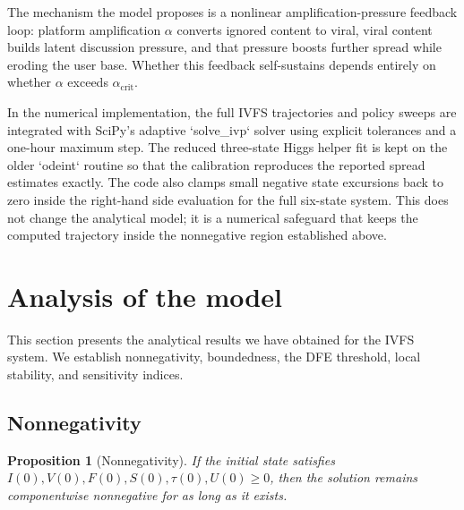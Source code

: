 \documentclass[11pt]{article}
\newtheorem{proposition}{Proposition}
\begin{document}
The mechanism the model proposes is a nonlinear amplification-pressure feedback loop: platform amplification $\alpha$ converts ignored content to viral, viral content builds latent discussion pressure, and that pressure boosts further spread while eroding the user base. Whether this feedback self-sustains depends entirely on whether $\alpha$ exceeds $\alpha_{\mathrm{crit}}$.

In the numerical implementation, the full IVFS trajectories and policy sweeps are integrated with SciPy's adaptive `solve\_ivp` solver using explicit tolerances and a one-hour maximum step. The reduced three-state Higgs helper fit is kept on the older `odeint` routine so that the calibration reproduces the reported spread estimates exactly. The code also clamps small negative state excursions back to zero inside the right-hand side evaluation for the full six-state system. This does not change the analytical model; it is a numerical safeguard that keeps the computed trajectory inside the nonnegative region established above.

\newpage
\section{Analysis of the model}
\label{sec:analysis}

This section presents the analytical results we have obtained for the IVFS system. We establish nonnegativity, boundedness, the DFE threshold, local stability, and sensitivity indices.

\subsection{Nonnegativity}

\begin{proposition}[Nonnegativity]
\label{prop:nonneg}
If the initial state satisfies $I(0), V(0), F(0), S(0), \tau(0), U(0) \geq 0$, then the solution remains componentwise nonnegative for as long as it exists.
\end{proposition}
\end{document}
